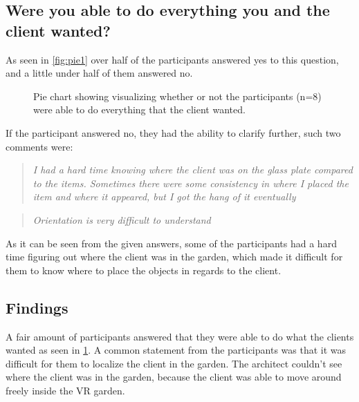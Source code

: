 \subsection*{Were you able to do everything you and the client wanted?}
As seen in \autoref{fig:pie1} over half of the participants answered yes to this question, and a little under half of them answered no.

\begin{figure}[H]
	\centering
	\caption{Pie chart showing visualizing whether or not the participants (n=8) were able to do everything that the client wanted.}
	\label{fig:pie1}
\end{figure}

If the participant answered no, they had the ability to clarify further, such two comments were:\\

 \begin{quote}
 	
\textit{I had a hard time knowing where the client was on the glass plate compared to the items. Sometimes there were some consistency in where I placed the item and where it appeared, but I got the hang of it eventually}\\
  \end{quote}
  
\begin{quote}
\textit{Orientation is very difficult to understand}\\
\end{quote}	
 	 
As it can be seen from the given answers, some of the participants had a hard time figuring out where the client was in the garden, which made it difficult for them to know where to place the objects in regards to the client.


\subsection{Findings}
A fair amount of participants answered that they were able to do what the clients wanted as seen in \ref{fig:pie1}. A common statement from the participants was that it was difficult for them to localize the client in the garden. The architect couldn't see where the client was in the garden, because the client was able to move around freely inside the VR garden.\\

